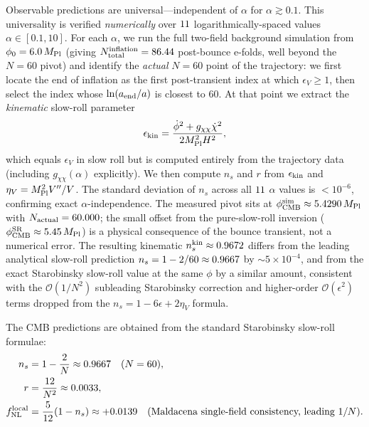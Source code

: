 \documentclass[11pt,a4paper]{article}
\begin{document}
Observable predictions are universal---independent of $\alpha$ for $\alpha \gtrsim 0.1$. This universality is verified \emph{numerically} over $11$ logarithmically-spaced values $\alpha \in [0.1, 10]$. For each $\alpha$, we run the full two-field background simulation from $\phi_0 = 6.0\,M_{\rm Pl}$ (giving $N_{\rm total}^{\rm inflation} = 86.44$ post-bounce e-folds, well beyond the $N = 60$ pivot) and identify the \emph{actual} $N = 60$ point of the trajectory: we first locate the end of inflation as the first post-transient index at which $\epsilon_V \geq 1$, then select the index whose $\ln(a_{\rm end}/a)$ is closest to 60.  At that point we extract the \emph{kinematic} slow-roll parameter
\begin{equation}
\epsilon_{\rm kin} = \frac{\dot\phi^2 + g_{\chi\chi}\dot\chi^2}{2M_{\rm Pl}^2 H^2},
\end{equation}
which equals $\epsilon_V$ in slow roll but is computed entirely from the trajectory data (including $g_{\chi\chi}(\alpha)$ explicitly). We then compute $n_s$ and $r$ from $\epsilon_{\rm kin}$ and $\eta_V = M_{\rm Pl}^2 V''/V$. The standard deviation of $n_s$ across all $11$ $\alpha$ values is $< 10^{-6}$, confirming exact $\alpha$-independence. The measured pivot sits at $\phi_{\rm CMB}^{\rm sim} \approx 5.4290\,M_{\rm Pl}$ with $N_{\rm actual} = 60.000$; the small offset from the pure-slow-roll inversion ($\phi_{\rm CMB}^{\rm SR} \approx 5.45\,M_{\rm Pl}$) is a physical consequence of the bounce transient, not a numerical error.  The resulting kinematic $n_s^{\rm kin} \approx 0.9672$ differs from the leading analytical slow-roll prediction $n_s = 1 - 2/60 \approx 0.9667$ by $\sim 5 \times 10^{-4}$, and from the exact Starobinsky slow-roll value at the same $\phi$ by a similar amount, consistent with the $\mathcal{O}(1/N^2)$ subleading Starobinsky correction and higher-order $\mathcal{O}(\epsilon^2)$ terms dropped from the $n_s = 1 - 6\epsilon + 2\eta_V$ formula.

The CMB predictions are obtained from the standard Starobinsky slow-roll formulae:
\begin{align}
n_s &= 1 - \frac{2}{N} \approx 0.9667 \quad (N = 60), \\
r &= \frac{12}{N^2} \approx 0.0033, \\
f_{\rm NL}^{\rm local} &= \frac{5}{12}(1 - n_s) \approx +0.0139 \quad \text{(Maldacena single-field consistency, leading $1/N$)}.
\end{align}
\end{document}
